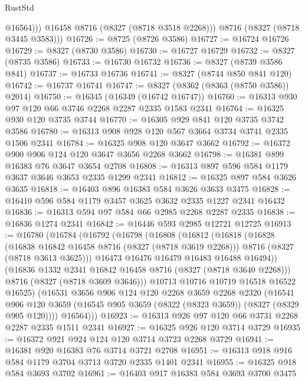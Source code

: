 \begin{lexlean}{RustStd}
\begin{coremodule}
{\begin{coremodule}
{{{{{{{{{{{{{{{{{{{{{{{{{{{{{{{{{{{{{{{{{{{{{{{{{{{{{{              @16564)))
        @16458
        @8716
        (@8327 (@8718 @3518 @2268)))
      @8716
      (@8327 (@8718 @3445 @3583)))
@16726 := @8725 (@8726 @3586)
@16727 := @16724 @16726
@16729 := @8327 (@8730 @3586)
@16730 := @16727 @16729
@16732 := @8327 (@8735 @3586)
@16733 := @16730 @16732
@16736 := @8327 (@8739 @3586 @841)
@16737 := @16733 @16736
@16741 := @8327 (@8744 @850 @841 @120)
@16742 := @16737 @16741
@16747 := @8327 (@8362 (@8363 (@8750 @3586)) @2014)
@16750 := @16345 (@16349 (@16742 @16747))
@16760 := @16313 @930 @97 @120 @66 @3746 @2268 @2287 @2335 @1583 @2341
@16764 := @16325 @930 @120 @3735 @3744
@16770 := @16305 @929 @841 @120 @3735 @3742 @3586
@16780 := @16313 @908 @928 @120 @567 @3664 @3734 @3741 @2335 @1506 @2341
@16784 := @16325 @908 @120 @3647 @3662
@16792 := @16372 @900 @906 @124 @120 @3647 @3656 @2268 @3662
@16798 := @16381 @899 @16383 @76 @3647 @3654 @2708
@16808 := @16313 @897 @596 @584 @1179 @3637 @3646 @3653 @2335 @1299 @2341
@16812 := @16325 @897 @584 @3626 @3635
@16818 := @16403 @896 @16383 @584 @3626 @3633 @3475
@16828 := @16410 @596 @584 @1179 @3457 @3625 @3632 @2335 @1227 @2341 @16432
@16836 := @16313 @594 @97 @584 @66 @2985 @2268 @2287 @2335
@16838 := @16836 @1274 @2341
@16842 := @16446 @593 @2985 @12721 @12725
@16913 := @16780
    (@16784
      (@16792
        (@16798
          (@16808
            (@16812
              (@16818
                (@16828
                  (@16838 @16842 @16458 @8716 (@8327 (@8718 @3619 @2268)))
                  @8716
                  (@8327 (@8718 @3613 @3625)))
                @16473
                @16476
                @16479
                @16483
                @16488
                @16494))
            (@16836 @1332 @2341 @16842 @16458 @8716 (@8327 (@8718 @3640 @2268)))
            @8716
            (@8327 (@8718 @3609 @3646)))
          @10713
          @10716
          @10719
          @16518
          @16522
          @16525)
        (@16531
          @3656
          @906
          @124
          @120
          @2268
          @3659
          @2268
          @2320
          (@16541
            @906
            @120
            @3659
            (@16545 @905 @3659 (@8322 (@8323 @3659)) (@8327 (@8329 @905 @120))))
          @16564)))
@16923 := @16313 @926 @97 @120 @66 @3731 @2268 @2287 @2335 @1511 @2341
@16927 := @16325 @926 @120 @3714 @3729
@16935 := @16372 @921 @924 @124 @120 @3714 @3723 @2268 @3729
@16941 := @16381 @920 @16383 @76 @3714 @3721 @2708
@16951 := @16313 @918 @916 @584 @1179 @3704 @3713 @3720 @2335 @1401 @2341
@16955 := @16325 @918 @584 @3693 @3702
@16961 := @16403 @917 @16383 @584 @3693 @3700 @3475
}}}}}}}}}}}}}}}}}}}}}}}}}}}}}}}}}}}}}}}}}}}}}}}}}}}}}}
\end{coremodule}}
\end{coremodule}
\end{lexlean}
